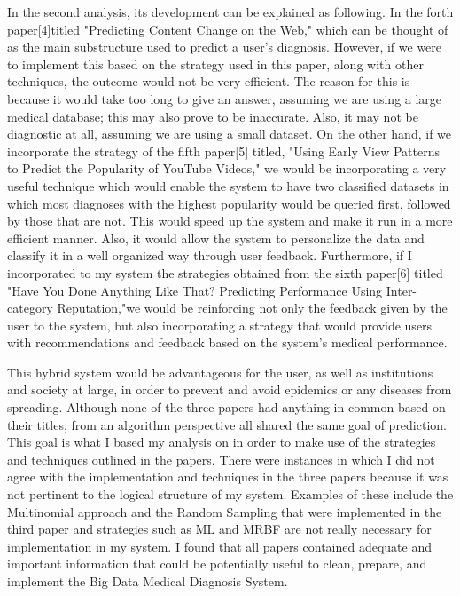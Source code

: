 \documentclass[sts]{sig-alternate}
\begin{document}
	In the second analysis, its development can be explained as following. In the forth paper[4]titled 		"Predicting Content Change on the Web," which can be thought of as the main substructure used to  		predict a user's diagnosis. However, if we were to implement this based on the strategy used in this 	paper, along with other techniques, the outcome would not be very efficient. 	The reason for this is 	because it would take too long to give an answer, assuming we are using a large medical database; 		this may also prove to be inaccurate. Also, it may not be diagnostic at all, 	assuming we are using 		a small dataset. On the other hand, if we incorporate the strategy of the fifth paper[5] titled, 			"Using Early View Patterns to Predict the Popularity of YouTube Videos," we would be incorporating a 	very useful technique which would enable the system to have two classified datasets in which most 		diagnoses with the highest popularity would be queried first, followed by those that are not. This 		would speed up the system and make it run in a more efficient manner. Also, it would allow the 			system to personalize the data and classify it in a well organized way through user feedback. 			Furthermore, if I incorporated to my system the strategies obtained from the sixth paper[6] titled 		"Have You Done Anything Like That? Predicting Performance Using Inter-category Reputation,"we would 		be reinforcing not only the feedback given by the user to the system, but also incorporating a 			strategy that would provide users with recommendations and feedback based on the system's medical 		performance. 
	
	This hybrid system would be advantageous for the user, as well as institutions and 	society at 			large, in order to prevent and avoid epidemics or any diseases from spreading. Although none of 			the three papers had anything in common based on their titles, from an algorithm 	perspective all 			shared the same goal of prediction. This goal is what I based my analysis on in order to make use of 	the strategies and techniques outlined in the papers. There were instances in which I did not agree 		with the implementation and techniques in the three papers because it was not pertinent to the 			logical structure of my system. Examples of these include the Multinomial approach and the Random 		Sampling that were implemented in the third paper and strategies such as ML and MRBF are not really 		necessary for implementation in my system. I found that all papers contained adequate and important 		information that could be potentially useful to clean, prepare, and implement the Big Data Medical 		Diagnosis System.
\end{document}
